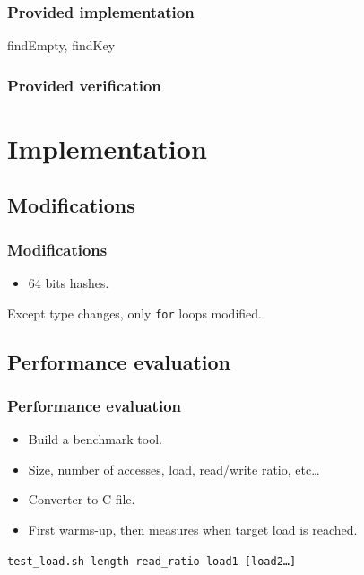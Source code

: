 \documentclass{beamer}
\begin{document}
\begin{frame}
	\frametitle{Provided implementation}
	findEmpty, findKey
\end{frame}

\begin{frame}
	\frametitle{Provided verification}
\end{frame}

\section{Implementation}
\subsection{Modifications}
\begin{frame}
	\frametitle{Modifications}

	\begin{itemize}
		\item 64 bits hashes.
	\end{itemize}
	\begin{center}
	\end{center}
	
	Except type changes, only \texttt{for} loops modified.

\end{frame}
\subsection{Performance evaluation}
\begin{frame}
	\frametitle{Performance evaluation}
	\begin{itemize}
		\item Build a benchmark tool.
		\item Size, number of accesses, load, read/write ratio, etc\ldots
		\item Converter to C file.
		\item First warms-up, then measures when target load is reached.
	\end{itemize}
	
	\vspace{0.5cm}
	\begin{center}
		\texttt{test\_load.sh length read\_ratio load1 [load2\ldots]}
	\end{center}

\end{frame}
\end{document}
